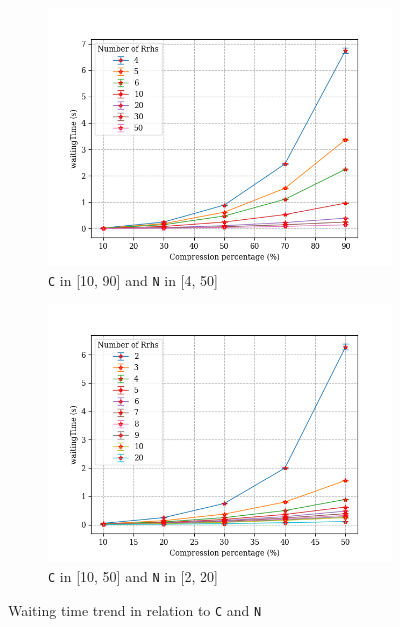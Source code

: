 \documentclass[11pt,a4paper,oneside, openright]{article}
\begin{document}
\begin{figure}
\centering
\begin{subfigure}{.5\textwidth}
  \centering
  \includegraphics[width=\linewidth]{images/c-vs-waiting}
  \caption{\texttt{C} in [10, 90] and \texttt{N} in [4, 50]}
  \label{fig:c-vs-waiting-1}
\end{subfigure}%
\begin{subfigure}{.5\textwidth}
  \centering
  \includegraphics[width=\linewidth]{images/c-vs-waiting-from-2}
  \caption{\texttt{C} in [10, 50] and \texttt{N} in [2, 20]}
  \label{fig:c-vs-waiting-2}
\end{subfigure}
\caption{Waiting time trend in relation to \texttt{C} and \texttt{N}}
\label{fig:c-vs-waiting}
\end{figure}
\end{document}
